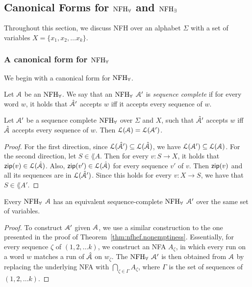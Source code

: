 
\subsection{Canonical Forms for $\textrm{NFH}_{\forall}$ and $\textrm{NFH}_{\exists}$}

Throughout this section, we discuss NFH over an alphabet $\Sigma$ with a set of variables $X = \{x_1,x_2,\ldots x_k\}$.

\subsubsection{A canonical form for $\textrm{NFH}_{\forall}$}

We begin with a canonical form for $\textrm{NFH}_{\forall}$.

Let $\mathcal{A}$ be an $\textrm{NFH}_{\forall}$. 
We say that an $\textrm{NFH}_{\forall}$ $\mathcal{A}'$ is {\em sequence complete} if for every word $w$, it holds that $\hat {\mathcal{A}}'$ accepts $w$ iff it accepts every sequence of $w$. 

\begin{lemma}
Let $\mathcal{A}'$ be a sequence complete $\textrm{NFH}_{\forall}$ over $\Sigma$ and $X$, such that 
$\hat{\mathcal{A}}'$ accepts $w$ iff $\hat{\mathcal{A}}$ accepts every sequence of $w$. 
Then $\mathcal{L}(\mathcal{A}) =\mathcal{L}(\mathcal{A}')$.
\end{lemma}
\begin{proof}
For the first direction, since $\mathcal{L}(\hat{\mathcal{A}}')\subseteq \mathcal{L}(\hat{\mathcal{A}})$, we have $\mathcal{L}(\mathcal{A}')\subseteq \mathcal{L}(\mathcal{A})$.
For the second direction, let 
$S\in\lang{A}$. Then for every $v:S\rightarrow X$, it holds that $\mathsf{zip}(v)\in\mathcal{L}(\hat{\mathcal{A}})$. Also,   $\mathsf{zip}(v')\in\mathcal{L}(\hat{\mathcal{A}})$ for every sequence $v'$ of $v$. Then $\mathsf{zip}(v)$ and all its sequences are in $\mathcal{L}(\hat{\mathcal{A}}')$. Since this holds for every $v:X\rightarrow S$, we have that $S\in\lang{A'}$.
\end{proof}


\begin{lemma}
Every $\textrm{NFH}_{\forall}$ $\mathcal{A}$ has an equivalent sequence-complete $\textrm{NFH}_{\forall}$ $\mathcal{A}'$ over the same set of variables. 
\end{lemma}
\begin{proof}
To construct $\mathcal{A}'$ given $\mathcal{A}$, we use a similar construction to the one presented in the proof of Theorem~\ref{thm:nfhef.nonemptiness}. Essentially, for every sequence $\zeta$ of $(1,2,\ldots k)$, we construct an NFA $A_\zeta$, in which every run on a word $w$ matches a run of $\hat{\mathcal{A}}$ on $w_\zeta$. 
The $\textrm{NFH}_{\forall}$ $\mathcal{A}'$ is then obtained from $\mathcal{A}$ by replacing the underlying NFA with $\bigcap_{\zeta\in\Gamma} A_\zeta$, where $\Gamma$ is the set of sequences of $(1,2,\ldots k)$.
\end{proof}

